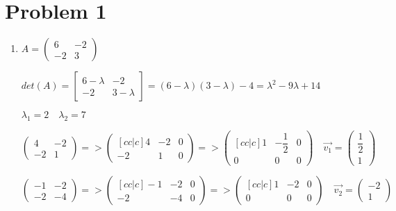 \documentclass[12pt,letterpaper]{article}
\begin{document}
\section*{Problem 1}
    \begin{enumerate}[label=(\alph*)]
        \item
        $A = \begin{pmatrix}
            6 & -2 \\
            -2 & 3
        \end{pmatrix}$
        
        $det(A) = \begin{bmatrix}
            6 - \lambda & -2 \\
            -2 & 3 - \lambda
        \end{bmatrix} = (6 - \lambda)(3 - \lambda) - 4 = \lambda^2 - 9\lambda + 14$
        
        $\lambda_1 = 2\quad\lambda_2 = 7$
        
        $\begin{pmatrix} 4 & -2 \\ -2 & 1 \end{pmatrix} => 
                \begin{pmatrix}[cc|c] 4 & -2 & 0 \\ -2 & 1 & 0 \end{pmatrix} => 
                \begin{pmatrix}[cc|c] 1 & -\dfrac{1}{2} & 0 \\ 0 & 0 & 0 \end{pmatrix} \quad \vec{v_1} = \begin{pmatrix} \dfrac{1}{2} \\ 1 \end{pmatrix}$
                
        $\begin{pmatrix} -1 & -2 \\ -2 & -4 \end{pmatrix} => 
                \begin{pmatrix}[cc|c] -1 & -2 & 0 \\ -2 & -4 & 0 \end{pmatrix} =>
                \begin{pmatrix}[cc|c] 1 & -2 & 0 \\ 0 & 0 & 0 \end{pmatrix} \quad \vec{v_2} = \begin{pmatrix} -2 \\ 1 \end{pmatrix}$
        

\end{enumerate}
\end{document}
